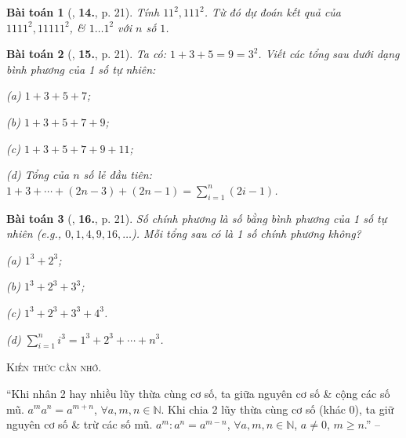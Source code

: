 \documentclass{article}
\numberwithin{equation}{section}
\newtheorem{baitoan}{Bài toán}[section]
\begin{document}
\begin{baitoan}[\cite{Trong_Toan_6_2021}, \textbf{14.}, p. 21]
	Tính $11^2,111^2$. Từ đó dự đoán kết quả của $1111^2,11111^2$, \& $1\ldots 1^2$ với $n$ số $1$.
\end{baitoan}

\begin{baitoan}[\cite{Trong_Toan_6_2021}, \textbf{15.}, p. 21]
	Ta có: $1 + 3 + 5 = 9 = 3^2$. Viết các tổng sau dưới dạng bình phương của 1 số tự nhiên:
	\begin{enumerate*}
		\item[(a)] $1 + 3 + 5 + 7$;
		\item[(b)] $1 + 3 + 5 + 7 + 9$;
		\item[(c)] $1 + 3 + 5 + 7 + 9 + 11$;
		\item[(d)] Tổng của $n$ số lẻ đầu tiên: $1 + 3 + \cdots + (2n - 3) + (2n - 1) = \sum_{i=1}^n (2i - 1)$.
	\end{enumerate*}
\end{baitoan}

\begin{baitoan}[\cite{Trong_Toan_6_2021}, \textbf{16.}, p. 21]
	\emph{Số chính phương} là số bằng bình phương của 1 số tự nhiên (e.g., $0,1,4,9,16,\ldots$). Mỗi tổng sau có là 1 số chính phương không?
	\begin{enumerate*}
		\item[(a)] $1^3 + 2^3$;
		\item[(b)] $1^3 + 2^3 + 3^3$;
		\item[(c)] $1^3 + 2^3 + 3^3 + 4^3$.
		\item[(d)] $\sum_{i=1}^n i^3 = 1^3 + 2^3 + \cdots + n^3$.
	\end{enumerate*}
\end{baitoan}
\noindent\textsc{Kiến thức cần nhớ.}
\begin{tcolorbox}
	``Khi nhân 2 hay nhiều lũy thừa cùng cơ số, ta giữa nguyên cơ số \& cộng các số mũ. $a^ma^n = a^{m + n}$, $\forall a,m,n\in\mathbb{N}$. Khi chia 2 lũy thừa cùng cơ số (khác $0$), ta giữ nguyên cơ số \& trừ các số mũ. $a^m:a^n = a^{m-n}$, $\forall a,m,n\in\mathbb{N}$, $a\ne 0$, $m\ge n$.'' -- \cite[p. 22]{Trong_Toan_6_2021}
\end{tcolorbox}
\end{document}
